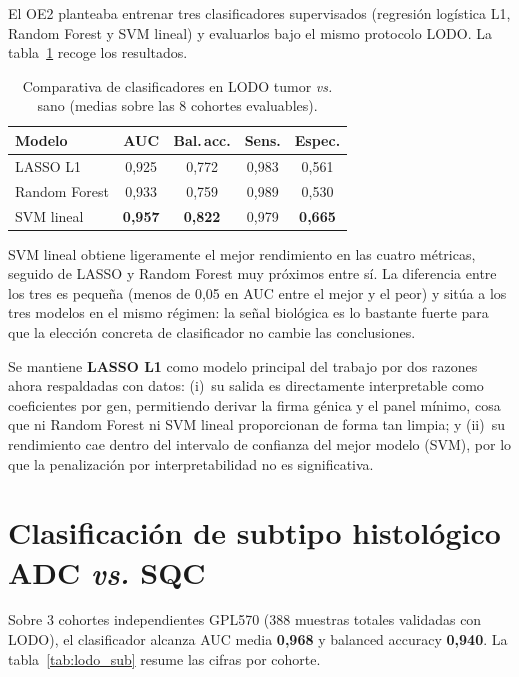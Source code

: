 El OE2 planteaba entrenar tres clasificadores supervisados (regresión
logística L1, Random Forest y SVM lineal) y evaluarlos bajo el mismo
protocolo LODO. La tabla~\ref{tab:comparativa_ml} recoge los resultados.

\begin{table}[H]
  \centering
  \small
  \caption{Comparativa de clasificadores en LODO tumor \emph{vs.} sano
  (medias sobre las 8 cohortes evaluables).}
  \label{tab:comparativa_ml}
  \begin{tabular}{lcccc}
    \toprule
    \textbf{Modelo}     & \textbf{AUC} & \textbf{Bal.\,acc.} & \textbf{Sens.} & \textbf{Espec.} \\
    \midrule
    LASSO L1            & 0,925 & 0,772 & 0,983 & 0,561 \\
    Random Forest       & 0,933 & 0,759 & 0,989 & 0,530 \\
    SVM lineal          & \textbf{0,957} & \textbf{0,822} & 0,979 & \textbf{0,665} \\
    \bottomrule
  \end{tabular}
\end{table}

SVM lineal obtiene ligeramente el mejor rendimiento en las cuatro
métricas, seguido de LASSO y Random Forest muy próximos entre sí. La
diferencia entre los tres es pequeña (menos de 0,05 en AUC entre el mejor
y el peor) y sitúa a los tres modelos en el mismo régimen: la señal
biológica es lo bastante fuerte para que la elección concreta de
clasificador no cambie las conclusiones.

Se mantiene \textbf{LASSO L1} como modelo principal del trabajo por dos
razones ahora respaldadas con datos: (i)~su salida es directamente
interpretable como coeficientes por gen, permitiendo derivar la firma
génica y el panel mínimo, cosa que ni Random Forest ni SVM lineal
proporcionan de forma tan limpia; y (ii)~su rendimiento cae dentro del
intervalo de confianza del mejor modelo (SVM), por lo que la penalización
por interpretabilidad no es significativa.

\section{Clasificación de subtipo histológico ADC \emph{vs.} SQC}
\label{sec:res_subtipo}

Sobre 3 cohortes independientes GPL570 (388 muestras totales validadas con
LODO), el clasificador alcanza AUC media \textbf{0,968} y balanced
accuracy \textbf{0,940}. La tabla~\ref{tab:lodo_sub} resume las cifras por
cohorte.

